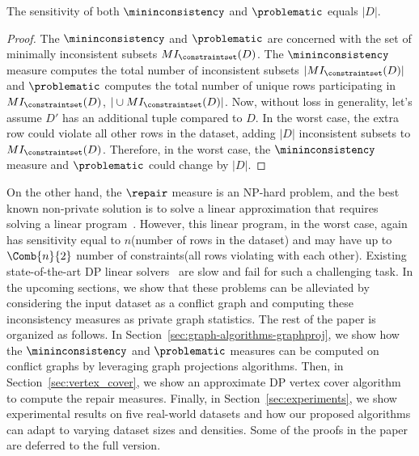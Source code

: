 \begin{proposition}
The sensitivity of both $\mininconsistency$ and $\problematic$ equals $|D|$. 
\label{prop:sens_mininconsistency_problematic_naive}
\end{proposition}
\begin{proof}
    The $\mininconsistency$ and $\problematic$ are concerned with the set of minimally inconsistent subsets $MI_\constraintset(D)$. The $\mininconsistency$ measure computes the total number of inconsistent subsets $|MI_\constraintset(D)|$ and $\problematic$ computes the total number of unique rows participating in $MI_\constraintset(D)$, $|\cup MI_\constraintset(D)|$. Now, without loss in generality, let's assume $D'$ has an additional tuple compared to $D$. In the worst case, the extra row could violate all other rows in the dataset, adding $|D|$ inconsistent subsets to $MI_\constraintset(D)$. Therefore, in the worst case, the $\mininconsistency$ measure and $\problematic$ could change by $|D|$.
\end{proof}

On the other hand, the $\repair$ measure is an NP-hard problem, and the best known non-private solution is to solve a linear approximation that requires solving a linear program~\cite{LivshitsBKS20}. However, this linear program, in the worst case, again has sensitivity equal to $n$(number of rows in the dataset) and may have up to $\Comb{n}{2}$ number of constraints(all rows violating with each other). Existing state-of-the-art DP linear solvers~\cite{hsu2014privately} are slow and fail for such a challenging task. In the upcoming sections, we show that these problems can be alleviated by considering the input dataset as a conflict graph and computing these inconsistency measures as private graph statistics. The rest of the paper is organized as follows. In Section~\ref{sec:graph-algorithms-graphproj}, we show how the $\mininconsistency$ and $\problematic$ measures can be computed on conflict graphs by leveraging graph projections algorithms. Then, in Section~\ref{sec:vertex_cover}, we show an approximate DP vertex cover algorithm to compute the repair measures. Finally, in Section~\ref{sec:experiments}, we show experimental results on five real-world datasets and how our proposed algorithms can adapt to varying dataset sizes and densities. 
\ifpaper
Some of the proofs in the paper are deferred to the full version.
\else
\fi
